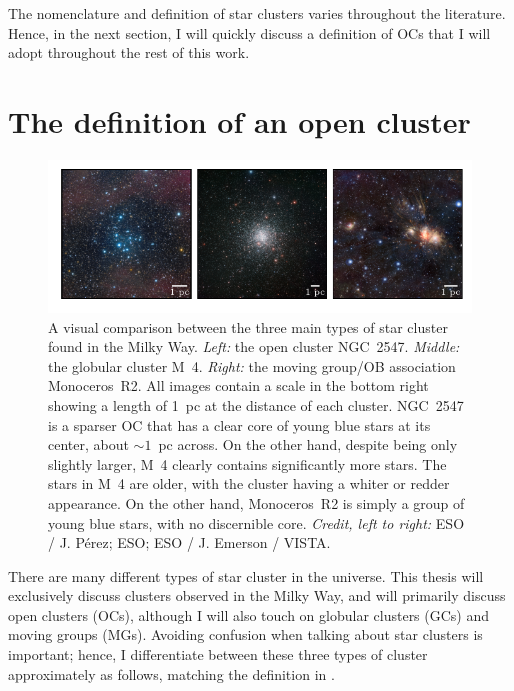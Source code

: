 The nomenclature and definition of star clusters varies throughout the literature. Hence, in the next section, I will quickly discuss a definition of OCs that I will adopt throughout the rest of this work.


\section{The definition of an open cluster}
\label{sec:intro:definition}

\begin{figure}[tb]
	\includegraphics[width=\textwidth]{fig/c1/oc_gc_mg_comparison.pdf}
	\caption{A visual comparison between the three main types of star cluster found in the Milky Way. \emph{Left:} the open cluster NGC~2547. \emph{Middle:} the globular cluster M~4. \emph{Right:} the moving group/OB association Monoceros~R2. All images contain a scale in the bottom right showing a length of 1~pc at the distance of each cluster. NGC~2547 is a sparser OC that has a clear core of young blue stars at its center, about $\sim 1$~pc across. On the other hand, despite being only slightly larger, M~4 clearly contains significantly more stars. The stars in M~4 are older, with the cluster having a whiter or redder appearance. On the other hand, Monoceros~R2 is simply a group of young blue stars, with no discernible core. \emph{Credit, left to right:} ESO / J. Pérez; ESO; ESO / J. Emerson / VISTA. }
	\label{fig:intro:definition:comparison}
\end{figure}

There are many different types of star cluster in the universe. This thesis will exclusively discuss clusters observed in the Milky Way, and will primarily discuss open clusters (OCs), although I will also touch on globular clusters (GCs) and moving groups (MGs). Avoiding confusion when talking about star clusters is important; hence, I differentiate between these three types of cluster approximately as follows, matching the definition in \cite{portegies_zwart_young_2010}.

